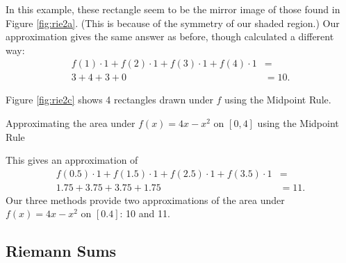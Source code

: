 \begin{solution}
\noindent In this example, these rectangle seem to be the mirror image of those found in Figure \ref{fig:rie2a}. (This is because of the symmetry of our shaded region.) Our approximation gives the same answer as before, though calculated a different way:
	\begin{align*} f(1)\cdot 1 + f(2)\cdot 1+ f(3)\cdot 1+f(4)\cdot 1 &=\\
	3+4+3+0&= 10.
	\end{align*}

Figure \ref{fig:rie2c} shows 4 rectangles drawn under $f$ using the Midpoint Rule.

\begin{minipage}[t]{\linewidth}
\begin{center}
\caption{Approximating the area under $f(x)= 4x-x^2$ on $ [0,4] $ using the Midpoint Rule \label{fig:rie2c}}
\end{center}
\end{minipage}

\noindent This gives an approximation of 
\begin{align*} f(0.5)\cdot 1 + f(1.5)\cdot 1+ f(2.5)\cdot 1+f(3.5)\cdot 1 &=\\
	1.75+3.75+3.75+1.75&= 11.
	\end{align*}
Our three methods provide two approximations of the area under $f(x)=4x-x^2 $ on $ [0.4] $: 10 and 11.
\end{solution}











\subsection{Riemann Sums}


